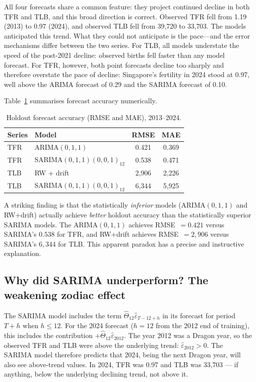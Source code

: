 \documentclass[12pt,a4paper]{article}
\begin{document}
All four forecasts share a common feature: they project continued decline in both
TFR and TLB, and this broad direction is correct. Observed TFR fell from 1.19 (2013)
to 0.97 (2024), and observed TLB fell from 39{,}720 to 33{,}703. The models
anticipated this trend. What they could not anticipate is the pace---and the error mechanisms differ
between the two series. For TLB, all models understate the speed of the post-2021
decline: observed births fell faster than any model forecast. For TFR, however, both
point forecasts decline too sharply and therefore overstate the pace of decline:
Singapore's fertility in 2024 stood at 0.97, well above the ARIMA forecast of 0.29
and the SARIMA forecast of 0.10.

Table~\ref{tab:hold_acc} summarises forecast accuracy numerically.

\begin{table}[H]
\centering
\caption{Holdout forecast accuracy (RMSE and MAE), 2013--2024.}
\label{tab:hold_acc}
\begin{tabular}{llcc}
\toprule
Series & Model & RMSE & MAE \\
\midrule
TFR & ARIMA$(0,1,1)$              & 0.421 & 0.369 \\
TFR & SARIMA$(0,1,1)(0,0,1)_{12}$ & 0.538 & 0.471 \\
\midrule
TLB & RW + drift                  & 2{,}906 & 2{,}226 \\
TLB & SARIMA$(0,1,1)(0,0,1)_{12}$ & 6{,}344 & 5{,}925 \\
\bottomrule
\end{tabular}
\end{table}

A striking finding is that the statistically \emph{inferior} models (ARIMA$(0,1,1)$
and RW+drift) actually achieve \emph{better} holdout accuracy than the statistically
superior SARIMA models. The ARIMA$(0,1,1)$ achieves RMSE~$=0.421$ versus SARIMA's
$0.538$ for TFR, and RW+drift achieves RMSE~$=2{,}906$ versus SARIMA's $6{,}344$ for
TLB. This apparent paradox has a precise and instructive explanation.

\subsection{Why did SARIMA underperform? The weakening zodiac effect}

The SARIMA model includes the term $\hat\Theta_{12}\hat\varepsilon_{T-12+h}$ in its
forecast for period $T+h$ when $h \leq 12$. For the 2024 forecast ($h=12$ from the
2012 end of training), this includes the contribution
$+\hat\Theta_{12}\hat\varepsilon_{2012}$. The year 2012 was a Dragon year, so the
observed TFR and TLB were above the underlying trend: $\hat\varepsilon_{2012}>0$.
The SARIMA model therefore predicts that 2024, being the next Dragon year, will also
see above-trend values. In 2024, TFR was 0.97 and TLB was 33{,}703 ---
if anything, below the underlying declining trend, not above it.
\end{document}
